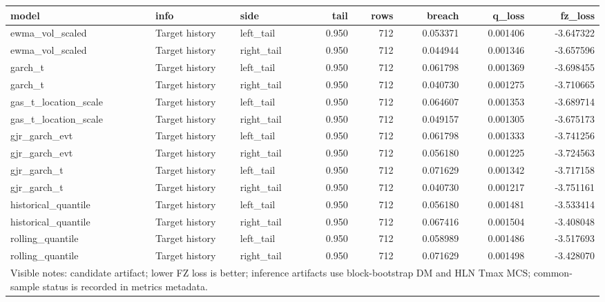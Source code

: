 \begin{tabular}{lllrrrrr}
\toprule
model & info & side & tail & rows & breach & q_loss & fz_loss \\
\midrule
ewma\_vol\_scaled & Target history & left\_tail & 0.950 & 712 & 0.053371 & 0.001406 & -3.647322 \\
ewma\_vol\_scaled & Target history & right\_tail & 0.950 & 712 & 0.044944 & 0.001346 & -3.657596 \\
garch\_t & Target history & left\_tail & 0.950 & 712 & 0.061798 & 0.001369 & -3.698455 \\
garch\_t & Target history & right\_tail & 0.950 & 712 & 0.040730 & 0.001275 & -3.710665 \\
gas\_t\_location\_scale & Target history & left\_tail & 0.950 & 712 & 0.064607 & 0.001353 & -3.689714 \\
gas\_t\_location\_scale & Target history & right\_tail & 0.950 & 712 & 0.049157 & 0.001305 & -3.675173 \\
gjr\_garch\_evt & Target history & left\_tail & 0.950 & 712 & 0.061798 & 0.001333 & -3.741256 \\
gjr\_garch\_evt & Target history & right\_tail & 0.950 & 712 & 0.056180 & 0.001225 & -3.724563 \\
gjr\_garch\_t & Target history & left\_tail & 0.950 & 712 & 0.071629 & 0.001342 & -3.717158 \\
gjr\_garch\_t & Target history & right\_tail & 0.950 & 712 & 0.040730 & 0.001217 & -3.751161 \\
historical\_quantile & Target history & left\_tail & 0.950 & 712 & 0.056180 & 0.001481 & -3.533414 \\
historical\_quantile & Target history & right\_tail & 0.950 & 712 & 0.067416 & 0.001504 & -3.408048 \\
rolling\_quantile & Target history & left\_tail & 0.950 & 712 & 0.058989 & 0.001486 & -3.517693 \\
rolling\_quantile & Target history & right\_tail & 0.950 & 712 & 0.071629 & 0.001498 & -3.428070 \\
\midrule
\multicolumn{8}{l}{\footnotesize Visible notes: candidate artifact; lower FZ loss is better; inference artifacts use block-bootstrap DM and HLN Tmax MCS; common-sample status is recorded in metrics metadata.} \\
\bottomrule
\end{tabular}
